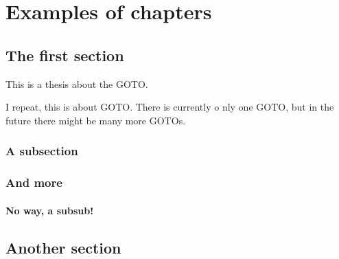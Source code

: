 \chapter{Examples of chapters}
\label{chap:examples}
\chaptoc{}
\newpage

\section{The first section}
\label{sec:section1}

This is a thesis about the \ac{GOTO}.

I repeat, this is about \ac{GOTO}. There is currently o nly one \ac{GOTO}, but in the future there might be many more \ac{GOTO}s.

\lipsum[1-2] %

\subsection{A subsection}

\lipsum[3-6] %

\subsection{And more}

\lipsum[7-9] %

\subsubsection{No way, a subsub!}

\lipsum[10-12] %


\section{Another section}
\label{sec:section2}

\lipsum[13-19] %
